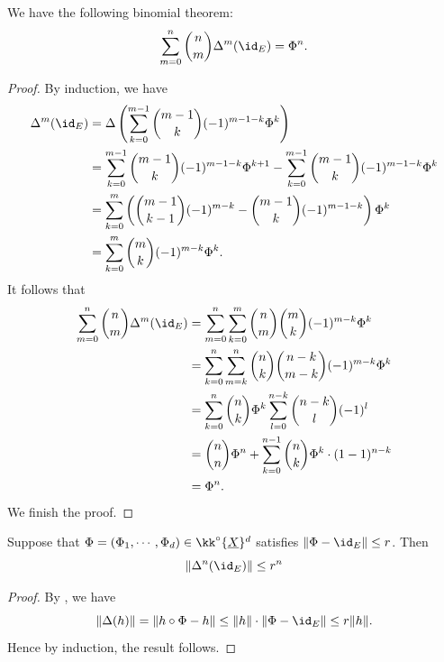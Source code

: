     \begin{lemma}\label{lem:difference_operators_and_binomial_theorem}
        We have the following binomial theorem:
        \[ \sum_{m=0}^n \binom{n}{m} \Delta^m(\id_E) = \Phi^n. \]
    \end{lemma}
    \begin{proof}
        By induction, we have
        \begin{align*}
            \Delta^m(\id_E) &= \Delta\left( \sum_{k=0}^{m-1} \binom{m-1}{k} (-1)^{m-1-k} \Phi^k \right) \\
                &= \sum_{k=0}^{m-1} \binom{m-1}{k} (-1)^{m-1-k} \Phi^{k+1} - \sum_{k=0}^{m-1} \binom{m-1}{k} (-1)^{m-1-k} \Phi^k \\
                &= \sum_{k=0}^{m} \left( \binom{m-1}{k-1} (-1)^{m-k} - \binom{m-1}{k} (-1)^{m-1-k} \right) \Phi^k \\
                &= \sum_{k=0}^{m} \binom{m}{k} (-1)^{m-k} \Phi^k.
        \end{align*}
        It follows that
        \begin{align*}
            \sum_{m=0}^n \binom{n}{m} \Delta^m(\id_E) &= \sum_{m=0}^n \sum_{k=0}^m \binom{n}{m} \binom{m}{k} (-1)^{m-k} \Phi^k \\
                &= \sum_{k=0}^n\sum_{m=k}^n \binom{n}{k} \binom{n-k}{m-k} (-1)^{m-k} \Phi^k  \\
                &= \sum_{k=0}^n \binom{n}{k} \Phi^k  \sum_{l=0}^{n-k} \binom{n-k}{l} (-1)^{l} \\
                &= \binom{n}{n} \Phi^n + \sum_{k=0}^{n-1} \binom{n}{k} \Phi^k \cdot (1-1)^{n-k} \\
                &= \Phi^n.
        \end{align*}
        We finish the proof.
    \end{proof}

    \begin{lemma}\label{lem:norm_of_difference_operators_of_Phi}
        Suppose that \(\Phi = (\Phi_1,\cdots,\Phi_d)\in \kk^\circ\{ \underline{X} \}^d\) satisfies \(\|\Phi - \id_E\| \leq r\).
        Then
        \[ \|\Delta^n(\id_E)\| \leq r^n \]
    \end{lemma}
    \begin{proof}
        By , we have
        \[ \|\Delta(h)\| = \|h \circ \Phi - h\| \leq \|h\| \cdot \|\Phi - \id_E\| \leq r \|h\|. \]
        Hence by induction, the result follows.
    \end{proof}

